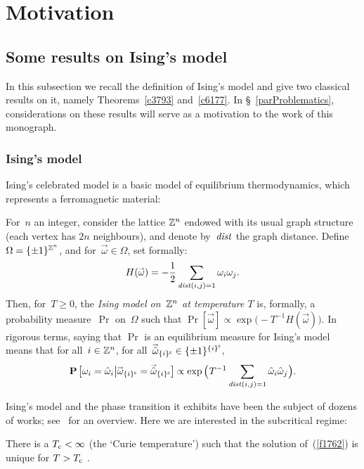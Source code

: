 \addtocounter{chapter}{-1}
\chapter{Motivation}\label{parMotivation}%

\section{Some results on Ising's model}\label{parSomeResultsOnIsingsModel}

In this subsection we recall the definition of Ising's model
and give two classical results on it, namely Theorems~\ref{c3793} and~\ref{c6177}.
In \S~\ref{parProblematics}, considerations on these results
will serve as a motivation to the work of this monograph.


\subsection{Ising's model}\label{parIsingsModel}

Ising's celebrated model is a basic model of equilibrium thermodynamics,
which represents a ferromagnetic material:
%
\begin{Def}
For~$n$ an integer, consider the lattice $\mathbb{Z}^n$ endowed
with its usual graph structure (each vertex has $2n$ neighbours),
and denote by~$\mathit{dist}$ the graph distance.
Define $\Omega = \{\pm1\}^{\mathbb{Z}^n}$,
and for~$\vec\omega\in\Omega$, set formally:
\[\label{for9073} H(\vec\omega) = - \frac{1}{2} \sum_{\dist(i,j)=1} \omega_i\omega_j .\]
%
Then, for~$T\geq0$, the \emph{Ising model on~$\mathbb{Z}^n$ at temperature $T$}
is, formally, a probability measure~$\Pr$ on~$\Omega$ such that
$\Pr[\vec\omega] \propto \exp\big(-T^{-1}H(\vec\omega)\big)$.
In rigorous terms, saying that $\Pr$ is an equilibrium measure for Ising's model
means that for all~$i\in\mathbb{Z}^n$,
for all~$\vechat\omega_{\C{\{i\}}} \in \{\pm1\}^{\C{\{i\}}}$,
\[\label{f1762} \Pr\big[ \omega_i = \hat\omega_i
\big| \vec\omega_{\C{\{i\}}} = \vechat\omega_{\C{\{i\}}} \big]
\propto \exp\Big( T^{-1} \sum_{\dist(i,j)=1} \hat\omega_i \hat\omega_j \Big) .\]
\end{Def}

Ising's model and the phase transition it exhibits
have been the subject of dozens of works; see~\cite{Grimmett} for an overview.
Here we are interested in the subcritical regime:
%
\begin{Thm}
There is a $T_{\mathrm{c}}<\infty$ (the `Curie temperature')
such that the solution of~(\ref{f1762}) is unique for $T>T_{\mathrm{c}}$ .
\end{Thm}


